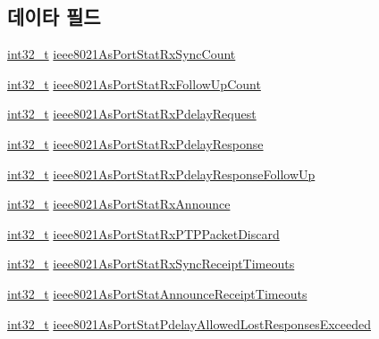 \subsection*{데이타 필드}
\begin{DoxyCompactItemize}
\item 
\hyperlink{parse_8c_a37994e3b11c72957c6f454c6ec96d43d}{int32\+\_\+t} \hyperlink{struct_port_counters__t_ac36dc6016c10e50c7bc588bd0b9c3215}{ieee8021\+As\+Port\+Stat\+Rx\+Sync\+Count}
\item 
\hyperlink{parse_8c_a37994e3b11c72957c6f454c6ec96d43d}{int32\+\_\+t} \hyperlink{struct_port_counters__t_af8699c2df41882d566e9a9e788550f0b}{ieee8021\+As\+Port\+Stat\+Rx\+Follow\+Up\+Count}
\item 
\hyperlink{parse_8c_a37994e3b11c72957c6f454c6ec96d43d}{int32\+\_\+t} \hyperlink{struct_port_counters__t_ab811057f41eb0aad0df7974d38d6f2b2}{ieee8021\+As\+Port\+Stat\+Rx\+Pdelay\+Request}
\item 
\hyperlink{parse_8c_a37994e3b11c72957c6f454c6ec96d43d}{int32\+\_\+t} \hyperlink{struct_port_counters__t_a75b087534d53a5127674d61a70903a6b}{ieee8021\+As\+Port\+Stat\+Rx\+Pdelay\+Response}
\item 
\hyperlink{parse_8c_a37994e3b11c72957c6f454c6ec96d43d}{int32\+\_\+t} \hyperlink{struct_port_counters__t_aa7ba5886701db1bcc580fbd1df7cab6e}{ieee8021\+As\+Port\+Stat\+Rx\+Pdelay\+Response\+Follow\+Up}
\item 
\hyperlink{parse_8c_a37994e3b11c72957c6f454c6ec96d43d}{int32\+\_\+t} \hyperlink{struct_port_counters__t_a38f25ba31521155ed8827ddfa43e8060}{ieee8021\+As\+Port\+Stat\+Rx\+Announce}
\item 
\hyperlink{parse_8c_a37994e3b11c72957c6f454c6ec96d43d}{int32\+\_\+t} \hyperlink{struct_port_counters__t_a45970c51124d83fab6fd609595979ffc}{ieee8021\+As\+Port\+Stat\+Rx\+P\+T\+P\+Packet\+Discard}
\item 
\hyperlink{parse_8c_a37994e3b11c72957c6f454c6ec96d43d}{int32\+\_\+t} \hyperlink{struct_port_counters__t_aad725b75584201c89729e897c0b2c1ab}{ieee8021\+As\+Port\+Stat\+Rx\+Sync\+Receipt\+Timeouts}
\item 
\hyperlink{parse_8c_a37994e3b11c72957c6f454c6ec96d43d}{int32\+\_\+t} \hyperlink{struct_port_counters__t_aaddd94015d8842fb411a4204293737fb}{ieee8021\+As\+Port\+Stat\+Announce\+Receipt\+Timeouts}
\item 
\hyperlink{parse_8c_a37994e3b11c72957c6f454c6ec96d43d}{int32\+\_\+t} \hyperlink{struct_port_counters__t_a0af2f3f1a44fcfd7fab7b377906fa06b}{ieee8021\+As\+Port\+Stat\+Pdelay\+Allowed\+Lost\+Responses\+Exceeded}

\end{DoxyCompactItemize}
